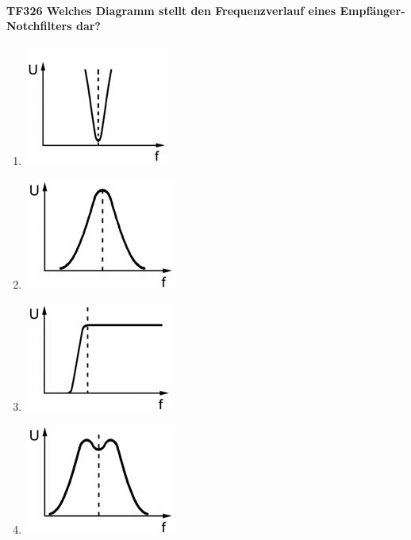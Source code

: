\documentclass[8pt]{article}
\begin{document}
\paragraph*{TF326 Welches Diagramm stellt den Frequenzverlauf eines Empfänger-Notchfilters dar?}
\begin{enumerate}[nolistsep,label=\Alph*]
\item
\begin{center}
	\begin{minipage}{\linewidth}
		\centering
		\includegraphics[scale=1.0]{pics/tf326_a.jpg}
	\end{minipage}
\end{center}
\item
\begin{center}
	\begin{minipage}{\linewidth}
		\centering
		\includegraphics[scale=1.0]{pics/tf326_b.jpg}
	\end{minipage}
\end{center}
\item
\begin{center}
	\begin{minipage}{\linewidth}
		\centering
		\includegraphics[scale=1.0]{pics/tf326_c.jpg}
	\end{minipage}
\end{center}
\item
\begin{center}
	\begin{minipage}{\linewidth}
		\centering
		\includegraphics[scale=1.0]{pics/tf326_d.jpg}
	\end{minipage}
\end{center}
\end{enumerate}
\end{document}
